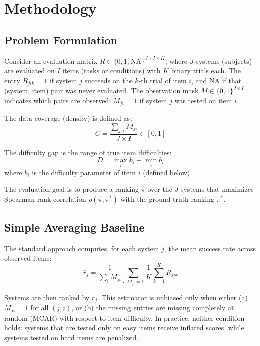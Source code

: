 \documentclass[11pt,a4paper]{article}
\begin{document}
\section{Methodology}

\subsection{Problem Formulation}

Consider an evaluation matrix $R \in \{0, 1, \text{NA}\}^{J \times I \times K}$, where $J$ systems (subjects) are evaluated on $I$ items (tasks or conditions) with $K$ binary trials each. The entry $R_{jik} = 1$ if system $j$ succeeds on the $k$-th trial of item $i$, and NA if that (system, item) pair was never evaluated. The observation mask $M \in \{0, 1\}^{J \times I}$ indicates which pairs are observed: $M_{ji} = 1$ if system $j$ was tested on item $i$.

The data coverage (density) is defined as:
\begin{equation}
C = \frac{\sum_{j,i} M_{ji}}{J \times I} \in [0, 1]
\end{equation}

The difficulty gap is the range of true item difficulties:
\begin{equation}
D = \max_i b_i - \min_i b_i
\end{equation}
where $b_i$ is the difficulty parameter of item $i$ (defined below).

The evaluation goal is to produce a ranking $\hat{\pi}$ over the $J$ systems that maximizes Spearman rank correlation $\rho(\hat{\pi}, \pi^*)$ with the ground-truth ranking $\pi^*$.

\subsection{Simple Averaging Baseline}

The standard approach computes, for each system $j$, the mean success rate across observed items:
\begin{equation}
\bar{r}_j = \frac{1}{\sum_i M_{ji}} \sum_{i: M_{ji}=1} \frac{1}{K} \sum_{k=1}^{K} R_{jik}
\end{equation}

Systems are then ranked by $\bar{r}_j$. This estimator is unbiased only when either (a) $M_{ji} = 1$ for all $(j, i)$, or (b) the missing entries are missing completely at random (MCAR) with respect to item difficulty. In practice, neither condition holds: systems that are tested only on easy items receive inflated scores, while systems tested on hard items are penalized.
\end{document}
